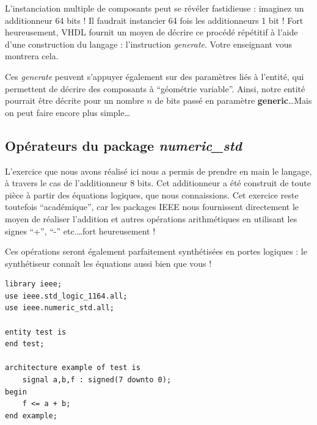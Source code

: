 \documentclass[a4paper,11pt]{article}
\begin{document}
L'instanciation multiple de composants peut se révéler fastidieuse : imaginez un additionneur 64 bits ! Il faudrait instancier 64 fois les additionneurs 1 bit ! Fort heureusement, VHDL fournit un moyen de décrire ce procédé répétitif à l'aide d'une construction du langage : l'instruction \textit{generate}. Votre enseignant vous montrera cela.

Ces \textit{generate} peuvent s'appuyer également sur des paramètres liés à l'entité, qui permettent de décrire des composants à ``géométrie variable''. Ainsi, notre entité pourrait être décrite pour un nombre $n$ de bits passé en paramètre \textbf{generic}\ldots Mais on peut faire encore plus simple\ldots

\subsection*{Opérateurs du package \textit{numeric\_std}}

L'exercice que nous avons réalisé ici nous a permis de prendre en main le langage, à travers le cas de l'additionneur 8 bits. Cet additionneur a été construit de toute pièce à partir des équations logiques, que nous connaissions. Cet exercice reste toutefois ``académique'', car les packages IEEE nous fournissent directement le moyen de réaliser l'addition et autres opérations arithmétiques en utilisant les signes ``+'', ``-'' etc.\ldots fort heureusement !

Ces opérations seront également parfaitement synthétisées en portes logiques : le synthétiseur connaît les équations aussi bien que vous !

\begin{lstlisting}[style=vhdlstyle]
library ieee;
use ieee.std_logic_1164.all;
use ieee.numeric_std.all;

entity test is
end test;

architecture example of test is
    signal a,b,f : signed(7 downto 0);
begin
    f <= a + b;
end example;
\end{lstlisting}
\end{document}
